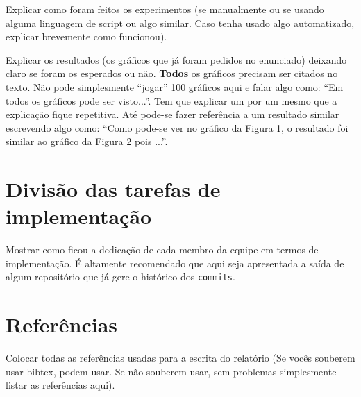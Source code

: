 \documentclass[12pt,a4paper]{article}
\begin{document}
Explicar como foram feitos os experimentos (se manualmente ou se
usando alguma linguagem de script ou algo similar. Caso tenha usado
algo automatizado, explicar brevemente como funcionou).

Explicar os resultados (os gráficos que já foram pedidos no
enunciado) deixando claro se foram os esperados ou não. \textbf{Todos}
os gráficos precisam ser citados no texto. Não pode simplesmente
``jogar'' 100 gráficos aqui e falar algo como: ``Em todos os gráficos
pode ser visto...''. Tem que explicar um por um mesmo que a explicação
fique repetitiva. Até pode-se fazer referência a um resultado similar
escrevendo algo como: ``Como pode-se ver no gráfico da Figura 1, o
resultado foi similar ao gráfico da Figura 2 pois ...''.

\section{Divisão das tarefas de implementação}

Mostrar como ficou a dedicação de cada membro da equipe em termos de
implementação. É altamente recomendado que aqui seja apresentada a
saída de algum repositório que já gere o histórico dos
\texttt{commits}.

\section{Referências}

Colocar todas as referências usadas para a escrita do relatório (Se
vocês souberem usar bibtex, podem usar. Se não souberem usar, sem
problemas simplesmente listar as referências aqui).
\end{document}
